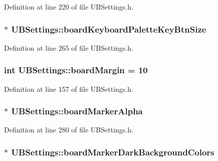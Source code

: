 Definition at line 220 of file U\-B\-Settings.\-h.

\hypertarget{class_u_b_settings_a56680561172b80d4f577be8a5829db10}{
\subsubsection[{board\-Keyboard\-Palette\-Key\-Btn\-Size}]{$\ast$ U\-B\-Settings\-::board\-Keyboard\-Palette\-Key\-Btn\-Size}}\label{db/d66/class_u_b_settings_a56680561172b80d4f577be8a5829db10}


Definition at line 265 of file U\-B\-Settings.\-h.

\hypertarget{class_u_b_settings_aff1d52afbc3bda4b82ad2bba4d7f86b0}{
\subsubsection[{board\-Margin}]{\setlength{\rightskip}{0pt plus 5cm}int U\-B\-Settings\-::board\-Margin = 10\hspace{0.3cm}{\ttfamily [static]}}}\label{db/d66/class_u_b_settings_aff1d52afbc3bda4b82ad2bba4d7f86b0}


Definition at line 157 of file U\-B\-Settings.\-h.

\hypertarget{class_u_b_settings_a3c96cf37dc85d70412b7bd64658686da}{
\subsubsection[{board\-Marker\-Alpha}]{$\ast$ U\-B\-Settings\-::board\-Marker\-Alpha}}\label{db/d66/class_u_b_settings_a3c96cf37dc85d70412b7bd64658686da}


Definition at line 280 of file U\-B\-Settings.\-h.

\hypertarget{class_u_b_settings_abe1fa4363f893e592ec213551fb70086}{
\subsubsection[{board\-Marker\-Dark\-Background\-Colors}]{$\ast$ U\-B\-Settings\-::board\-Marker\-Dark\-Background\-Colors}}\label{db/d66/class_u_b_settings_abe1fa4363f893e592ec213551fb70086}


